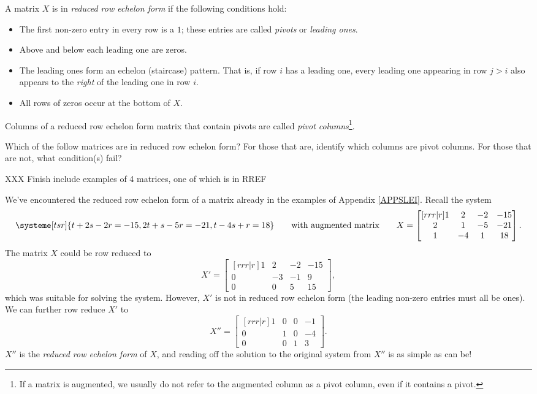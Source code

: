	\begin{definition}
		A matrix $X$ is in \emph{reduced row echelon form} if the following conditions hold:
		\smallskip
		\begin{itemize}
			\item The first non-zero entry in every row is a $1$; these entries are called \emph{pivots}
				or \emph{leading ones}.
			\item Above and below each leading one are zeros.
			\item The leading ones form an echelon (staircase) pattern. That is, if row $i$ has a leading
				one, every leading one appearing in row $j>i$ also appears to the {\it right} of
				the leading one in row $i$.
			\item All rows of zeros occur at the bottom of $X$.
		\end{itemize}
		\smallskip

		Columns of a reduced row echelon form matrix that contain pivots are called \emph{pivot columns}\footnote{
			If a matrix is augmented, we usually do not refer to the augmented column as a pivot column, even
			if it contains a pivot.
		}.
	\end{definition}

	\begin{example}
		Which of the follow matrices are in reduced row echelon form? For those that are, identify which
		columns are pivot columns. For those that are not, what condition(s) fail?

		XXX Finish include examples of 4 matrices, one of which is in RREF
	\end{example}

	We've encountered the reduced row echelon form of a matrix already in the examples of Appendix \ref{APPSLEI}.
	Recall the system 
	\[
		\systeme[tsr]{
			t+2s-2r=-15,
			2t+s-5r=-21,
			t-4s+r=18
		}\qquad\text{with augmented matrix}\qquad
		X=\begin{bmatrix}[rrr|r]
			1&2&-2 & -15\\
			2&1&-5&-21\\
			1&-4&1&18
		\end{bmatrix}.
	\]
	The matrix $X$ could be row reduced to
	\[
		X'=\begin{bmatrix}[rrr|r]
			1&2&-2 & -15\\
			0&-3&-1&9\\
			0&0&5&15
		\end{bmatrix},
	\]
	which was suitable for solving the system. However, $X'$ is not in reduced row echelon form (the leading non-zero entries
	must all be ones). We can further row reduce $X'$ to
	\[
		X''=\begin{bmatrix}[rrr|r]
			1&0&0 & -1\\
			0&1&0&-4\\
			0&0&1&3
		\end{bmatrix}.
	\]
	$X''$ is the \emph{reduced row echelon form} of $X$, and reading off the solution to the original system from $X''$ is as simple
	as can be!

